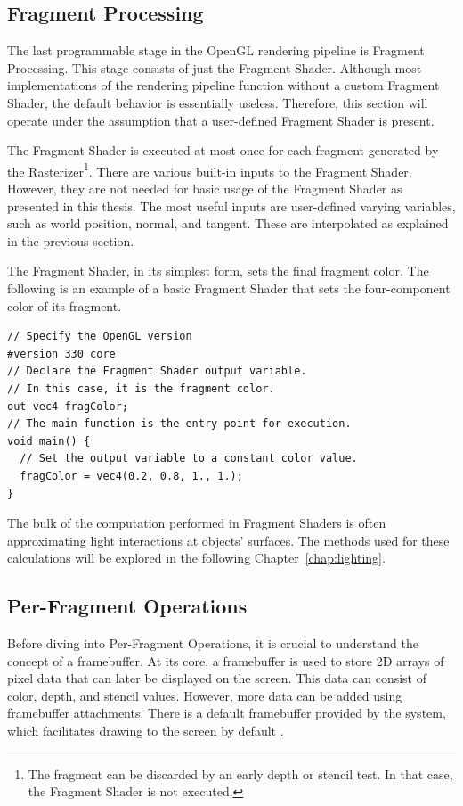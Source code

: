 \documentclass[
  digital,     %
  oneside,     %
  nosansbold,  %
  nocolorbold, %
  lof,         %
  lot,         %
]{fithesis4}
\begin{document}
\subsection{Fragment Processing}
The last programmable stage in the OpenGL rendering pipeline is Fragment Processing.
This stage consists of just the Fragment Shader. Although most implementations of the rendering pipeline function
without a custom Fragment Shader, the default behavior is essentially useless. Therefore, this section will
operate under the assumption that a user-defined Fragment Shader is present.

The Fragment Shader is executed at most once for each fragment generated by the Rasterizer\footnote{The fragment
can be discarded by an early depth or stencil test. In that case, the Fragment Shader is not executed.}.
There are various built-in inputs to the Fragment Shader. However, they are not needed for basic usage of the
Fragment Shader as presented in this thesis. The most useful inputs are user-defined varying variables,
such as world position, normal, and tangent. These are interpolated as explained in the previous section.

The Fragment Shader, in its simplest form, sets the final fragment color. The following is an example
of a basic Fragment Shader that sets the four-component color of its fragment.
\begin{verbatim}
// Specify the OpenGL version
#version 330 core
// Declare the Fragment Shader output variable.
// In this case, it is the fragment color.
out vec4 fragColor;
// The main function is the entry point for execution.
void main() {
  // Set the output variable to a constant color value.
  fragColor = vec4(0.2, 0.8, 1., 1.);
}
\end{verbatim}

The bulk of the computation performed in Fragment Shaders is often approximating light interactions at objects' surfaces.
The methods used for these calculations will be explored in the following Chapter~\ref{chap:lighting}.

\subsection{Per-Fragment Operations}\label{sec:per-fragment-operations}
Before diving into Per-Fragment Operations, it is crucial to understand the concept of a framebuffer.
At its core, a framebuffer is used to store 2D arrays of pixel data that can later be displayed on the screen.
This data can consist of color, depth, and stencil values. However, more data can be added using framebuffer
attachments. There is a default framebuffer provided by the system, which facilitates drawing to the screen by default \cite{opengl-spec}.
\end{document}
